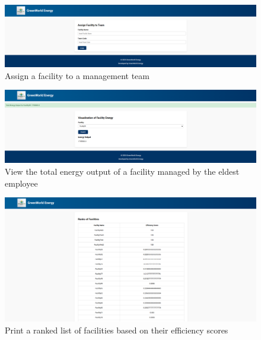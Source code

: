 \begin{figure}[H]
    \centering
    \includegraphics[width=\textwidth]{images/Op3.png}
    \caption{Assign a facility to a management team}
\end{figure}


\begin{figure}[H]
    \centering
    \includegraphics[width=\textwidth]{images/Op4.png}
    \caption{View the total energy output of a facility managed by the eldest employee}
\end{figure}


\begin{figure}[H]
    \centering
    \includegraphics[width=\textwidth]{images/Op5.png}
    \caption{Print a ranked list of facilities based on their efficiency scores}
\end{figure}